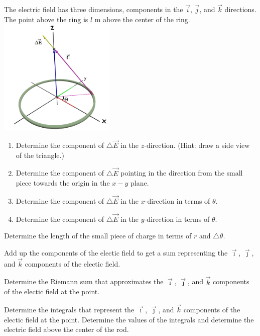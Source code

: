 \begin{problem}
\begin{subproblem}
    \clearpage

     \item The electric field has three dimensions, components in the $\vec{i}$, $\vec{j}$, and $\vec{k}$ directions.
        The point above the ring is $l$ m above the center of the ring.
       \includegraphics[width=15em]{blender/ringCharge-components}
       \begin{enumerate}
         \item Determine the component of $\triangle \vec{E}$ in the $z$-direction. (Hint: draw a side view of the triangle.)
         \vfill
         \item Determine the component of $\triangle \vec{E}$ pointing in the direction from the small piece towards the origin in the $x-y$ plane.
         \vfill
         \item Determine the component of $\triangle \vec{E}$ in the $x$-direction in terms of $\theta$.
         \vfill
         \item Determine the component of $\triangle \vec{E}$ in the $y$-direction in terms of $\theta$.
         \vfill
       \end{enumerate}
       \clearpage
     \item Determine the length of the small piece of charge in terms of $r$ and $\triangle\theta$.
         \vspace{2em}
     \item Add up the components of the electic field to get a sum representing the
      $\vec{\imath}$, $\vec{\jmath}$, and $\vec{k}$ components of the electic field.
      \vfill
    \item  Determine the Riemann sum that approximates the $\vec{\imath}$, $\vec{\jmath}$, and $\vec{k}$ components of the electic field at the point.
      \vspace{4em}
    \item Determine the integrals that represent the $\vec{\imath}$, $\vec{\jmath}$, and $\vec{k}$ components of the electic field at the point.
      Determine the values of the integrals and determine the electric field above the center of the rod.
      \vfill
      \vfill
      \vfill
  \end{subproblem}

\end{problem}

